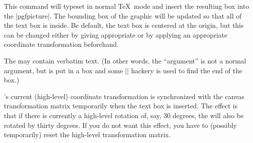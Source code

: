 \begin{command}{\pgftext{}}
  This command will typeset  in normal \TeX\ mode and
  insert the resulting box into the |{pgfpicture}|. The bounding box
  of the graphic will be updated so that all of the text box is
  inside. Be default, the text box is centered at the origin, but this
  can be changed either by giving appropriate  or by
  applying an appropriate coordinate transformation beforehand.

  The  may contain verbatim text. (In other words, the
   ``argument'' is not a normal argument, but is put in a
  box and some |\aftergroup| hackery is used to find the end of the
  box.)

  \pgfname's current (high-level) coordinate transformation is
  synchronized with the canvas transformation matrix temporarily
  when the text box is inserted. The effect is that if there is
  currently a high-level rotation of, say, 30 degrees, the 
  will also be rotated by thirty degrees. If you do not want this
  effect, you have to (possibly temporarily) reset the high-level
  transformation matrix.


\end{command}
